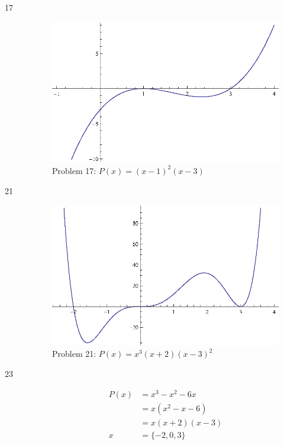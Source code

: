 \documentclass{exam}
\begin{document}
\begin{description}
    \item[17]
      \begin{figure}[H]
        \centering
        \includegraphics[scale=0.9]{problem17.eps}
        \caption*{Problem 17: $P(x) = (x - 1)^2(x - 3)$}
      \end{figure}

    \item[21]
      \begin{figure}[H]
        \centering
        \includegraphics[scale=0.9]{problem21.eps}
        \caption*{Problem 21: $P(x) = x^3(x + 2)(x - 3)^2$}
      \end{figure}

    \item[23] 
      \begin{align*}
        P(x) &= x^3 - x^2 - 6x \\
             &= x(x^2 - x - 6) \\
             &= x(x + 2)(x - 3) \\
        x    &= \{ -2, 0, 3 \} \\
      \end{align*}
      

\end{description}
\end{document}
